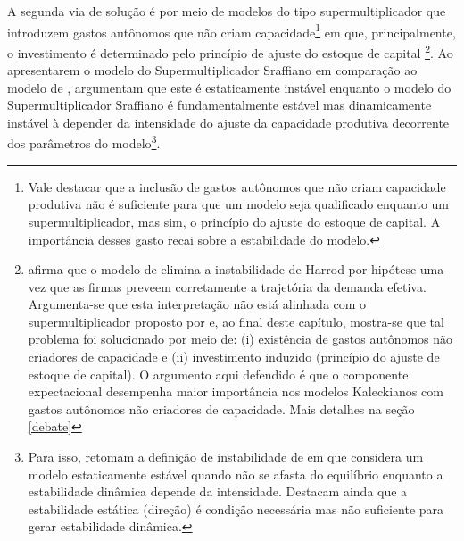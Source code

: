 A segunda via de solução é por meio de modelos do tipo supermultiplicador que introduzem gastos autônomos que não criam capacidade\footnote{Vale destacar que a inclusão de gastos autônomos que não criam capacidade produtiva não é suficiente para que um modelo seja qualificado enquanto um supermultiplicador, mas sim, o princípio do ajuste do estoque de capital. A importância desses gasto recai sobre a estabilidade do modelo.} em que, principalmente, o investimento é determinado pelo princípio de ajuste do estoque de capital \cites{serrano_long_1995}{serrano_sraffian_1995}{bortis_institutions_1996}\footnote{\textcite[p.~7]{allain_macroeconomic_2014} afirma que o modelo de \textcite{serrano_long_1995} elimina a instabilidade de Harrod por hipótese uma vez que as firmas preveem corretamente a trajetória da demanda efetiva. Argumenta-se que esta interpretação não está alinhada com o supermultiplicador proposto por \textcite{serrano_sraffian_1995} e, ao final deste capítulo, mostra-se que tal problema foi solucionado por meio de: (i) existência de gastos autônomos não criadores de capacidade e (ii) investimento induzido (princípio do ajuste de estoque de capital). O argumento aqui defendido é que o componente expectacional desempenha maior importância nos modelos Kaleckianos com gastos autônomos não criadores de capacidade. Mais detalhes na seção \ref{debate}}.
Ao apresentarem o modelo do Supermultiplicador Sraffiano em comparação ao modelo de \textcite{harrod_essay_1939}, \textcite{serrano_trouble_2017} argumentam que este é estaticamente instável enquanto o modelo do Supermultiplicador Sraffiano é fundamentalmente estável mas dinamicamente instável à depender da intensidade do ajuste da capacidade produtiva decorrente dos parâmetros do modelo\footnote{Para isso, retomam a definição de instabilidade de \textcite{hicks_contribution_1972} em que considera um modelo estaticamente estável quando não se afasta do equilíbrio enquanto a estabilidade dinâmica depende da intensidade. Destacam ainda que a estabilidade estática (direção) é condição necessária mas não suficiente para gerar estabilidade dinâmica.}.

